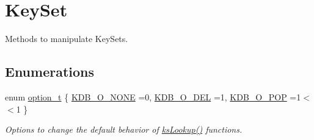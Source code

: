 \hypertarget{group__keyset}{}\section{Key\+Set}
\label{group__keyset}


Methods to manipulate Key\+Sets.  


\subsection*{Enumerations}
\begin{DoxyCompactItemize}
\item 
enum \mbox{\hyperlink{group__keyset_ga98a3d6a4016c9dad9cbd1a99a9c2a45a}{option\+\_\+t}} \{ \mbox{\hyperlink{group__keyset_gga98a3d6a4016c9dad9cbd1a99a9c2a45aa00738455e0ae843c8720809d8287f370}{K\+D\+B\+\_\+\+O\+\_\+\+N\+O\+NE}} =0, 
\mbox{\hyperlink{group__keyset_gga98a3d6a4016c9dad9cbd1a99a9c2a45aa66a5380c120f25f28f49848c4a863ead}{K\+D\+B\+\_\+\+O\+\_\+\+D\+EL}} =1, 
\mbox{\hyperlink{group__keyset_gga98a3d6a4016c9dad9cbd1a99a9c2a45aa52fb5f2cc86773d393da62bebebf7984}{K\+D\+B\+\_\+\+O\+\_\+\+P\+OP}} =1$<$$<$1
 \}
\begin{DoxyCompactList}\small\item\em Options to change the default behavior of \mbox{\hyperlink{group__keyset_gaa34fc43a081e6b01e4120daa6c112004}{ks\+Lookup()}} functions. \end{DoxyCompactList}\end{DoxyCompactItemize}
